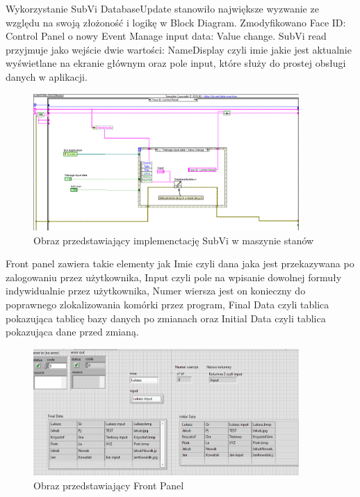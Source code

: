 \documentclass{report}
\begin{document}
Wykorzystanie SubVi DatabaseUpdate stanowiło największe wyzwanie ze względu na swoją złożoność i logikę w Block Diagram. Zmodyfikowano Face ID: Control Panel o nowy Event
Manage input data: Value change. SubVi read przyjmuje jako wejście dwie wartości: NameDisplay czyli imie jakie jest aktualnie wyświetlane na ekranie głównym oraz pole input, które 
służy do prostej obsługi danych w aplikacji.

\begin{figure}[H]
    \centering
    \includegraphics[width=0.9\textwidth]{src/Database/Database_update.png}
    \caption{Obraz przedstawiający implemenctację SubVi w maszynie stanów}
    \label{fig:first-att}
\end{figure}

Front panel zawiera takie elementy jak Imie czyli dana jaka jest przekazywana po zalogowaniu przez użytkownika, Input czyli pole na wpisanie dowolnej formuły indywidualnie przez użytkownika,
Numer wiersza jest on konieczny do poprawnego zlokalizowania komórki przez program, Final Data czyli tablica pokazująca tablicę bazy danych po zmianach oraz Initial Data czyli tablica pokazująca
dane przed zmianą.

\begin{figure}[H]
    \centering
    \includegraphics[width=0.9\textwidth]{src/Database/Database_update_subvi_frontpanel.png}
    \caption{Obraz przedstawiający Front Panel}
    \label{fig:first-att}
\end{figure}
\end{document}
